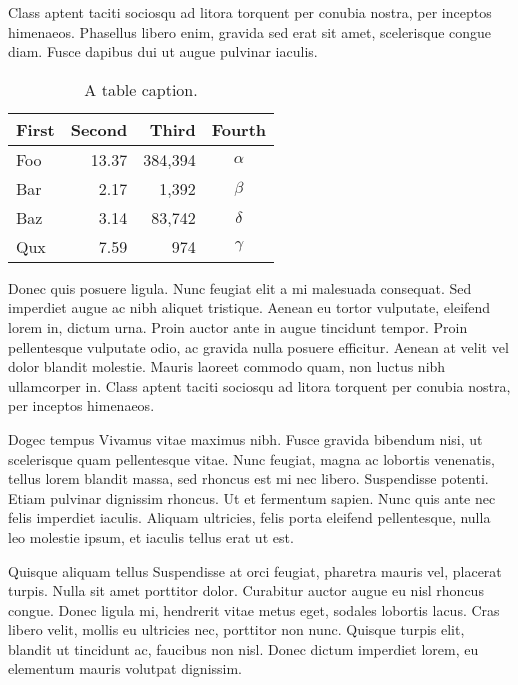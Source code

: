 \documentclass[12pt]{beamer}
\begin{document}
\begin{frame}[t]
\begin{multicols}{2}
Class aptent taciti sociosqu ad litora torquent per conubia nostra, per inceptos himenaeos. Phasellus libero enim, gravida sed erat sit amet, scelerisque congue diam. Fusce dapibus dui ut augue pulvinar iaculis.

\begin{table}
    \vspace{0.5\baselineskip}
    \centering
    \begin{tabular}{lrrc}
        \toprule
        \textbf{First} & \textbf{Second} & \textbf{Third} & \textbf{Fourth} \\
        \midrule
        Foo & 13.37 & 384,394 & $\alpha$ \\
        Bar & 2.17 & 1,392 & $\beta$ \\
        Baz & 3.14 & 83,742 & $\delta$ \\
        Qux & 7.59 & 974 & $\gamma$ \\
        \bottomrule
    \end{tabular}
    \caption{A table caption.}
\end{table}

Donec quis posuere ligula. Nunc feugiat elit a mi malesuada consequat. Sed imperdiet augue ac nibh aliquet tristique. Aenean eu tortor vulputate, eleifend lorem in, dictum urna. Proin auctor ante in augue tincidunt tempor. Proin pellentesque vulputate odio, ac gravida nulla posuere efficitur. Aenean at velit vel dolor blandit molestie. Mauris laoreet commodo quam, non luctus nibh ullamcorper in. Class aptent taciti sociosqu ad litora torquent per conubia nostra, per inceptos himenaeos.

\vspace{0.25\baselineskip}

\begin{block}{Dogec tempus}
    Vivamus vitae maximus nibh. Fusce gravida bibendum nisi, ut scelerisque quam pellentesque vitae. Nunc feugiat, magna ac lobortis venenatis, tellus lorem blandit massa, sed rhoncus est mi nec libero. Suspendisse potenti. Etiam pulvinar dignissim rhoncus. Ut et fermentum sapien. Nunc quis ante nec felis imperdiet iaculis. Aliquam ultricies, \alert{felis porta eleifend} pellentesque, nulla leo molestie ipsum, et iaculis tellus erat ut est.
\end{block}

\vspace{0.25\baselineskip}

\begin{alertblock}{Quisque aliquam tellus}
    Suspendisse at orci feugiat, pharetra mauris vel, placerat turpis. Nulla sit amet porttitor dolor. Curabitur auctor augue eu nisl rhoncus congue. Donec ligula mi, hendrerit vitae metus eget, sodales lobortis lacus. Cras libero velit, mollis eu ultricies nec, porttitor non nunc. Quisque turpis elit, blandit ut tincidunt ac, faucibus non nisl. Donec dictum imperdiet lorem, eu elementum mauris volutpat dignissim.
\end{alertblock}


\end{multicols}
\end{frame}
\end{document}
